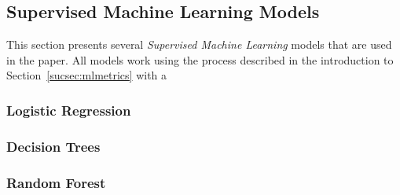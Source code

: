 \subsection{Supervised Machine Learning Models}
\label{subsec:supervised_machine_learning}

This section presents several \emph{Supervised Machine Learning} models that are used in the paper. All models work using the process described in the introduction to Section~\ref{sucsec:mlmetrics} with a 

\subsubsection{Logistic Regression}
\label{subsec:logisticregression}

\subsubsection{Decision Trees}
\label{subsec:decisiontrees}

\subsubsection{Random Forest}
\label{subsec:randomforest}

